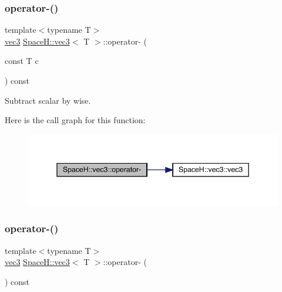 \subsubsection{\texorpdfstring{operator-\/()}{operator-()}\hspace{0.1cm}{\footnotesize\ttfamily [6/11]}}
{\footnotesize\ttfamily template$<$typename T$>$ \\
\mbox{\hyperlink{struct_space_h_1_1vec3}{vec3}} \mbox{\hyperlink{struct_space_h_1_1vec3}{Space\+H\+::vec3}}$<$ T $>$\+::operator-\/ (\begin{DoxyParamCaption}\item[{const T}]{c }\end{DoxyParamCaption}) const\hspace{0.3cm}{\ttfamily [inline]}}



Subtract scalar by wise. 

Here is the call graph for this function\+:
\nopagebreak
\begin{figure}[H]
\begin{center}
\leavevmode
\includegraphics[width=345pt]{struct_space_h_1_1vec3_a05e464381d8e6757e6604fd42a62fec6_cgraph}
\end{center}
\end{figure}
\mbox{\label{struct_space_h_1_1vec3_a74db760e195c089b32b5319e9d45028e}} 
\subsubsection{\texorpdfstring{operator-\/()}{operator-()}\hspace{0.1cm}{\footnotesize\ttfamily [7/11]}}
{\footnotesize\ttfamily template$<$typename T$>$ \\
\mbox{\hyperlink{struct_space_h_1_1vec3}{vec3}} \mbox{\hyperlink{struct_space_h_1_1vec3}{Space\+H\+::vec3}}$<$ T $>$\+::operator-\/ (\begin{DoxyParamCaption}{ }\end{DoxyParamCaption}) const\hspace{0.3cm}{\ttfamily [inline]}}



